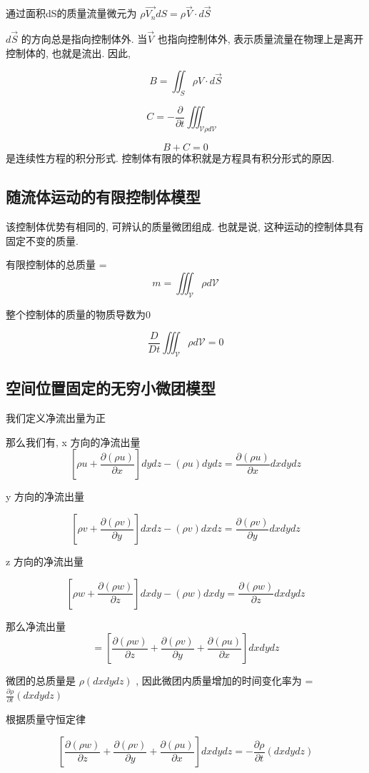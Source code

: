 通过面积dS的质量流量微元为 $\rho \vec{V_n} dS = \rho \vec{V} \cdot d\vec{S}$

$d \vec{S}$ 的方向总是指向控制体外. 当$\vec{V}$ 也指向控制体外, 表示质量流量在物理上是离开控制体的, 也就是流出. 因此,

$$
	B = \iint_{S} \rho V \cdot d\vec{S}
$$

$$
	C = - \frac{\partial}{\partial t}\iiint_{\mathcal{V} \rho d \mathcal{V}}
$$

$$
	B + C = 0
$$
是连续性方程的积分形式. 控制体有限的体积就是方程具有积分形式的原因.


\subsection{随流体运动的有限控制体模型}
该控制体优势有相同的, 可辨认的质量微团组成. 也就是说, 这种运动的控制体具有固定不变的质量.

有限控制体的总质量 =
$$
	m = \iiint_{\mathcal{V}} \rho d \mathcal{V}
$$

整个控制体的质量的物质导数为0

$$
	\frac{D}{Dt} \iiint_{\mathcal{V}} \rho d \mathcal{V} = 0
$$

\subsection{空间位置固定的无穷小微团模型}

我们定义净流出量为正

那么我们有, x 方向的净流出量
$$
	[ \rho u + \frac{\partial (\rho u)}{\partial x} ] dy dz - (\rho u) dydz = \frac{\partial (\rho u)}{\partial x} dxdydz
$$

y 方向的净流出量

$$
	[ \rho v + \frac{\partial (\rho v)}{\partial y} ] dx dz - (\rho v) dxdz = \frac{\partial (\rho v)}{\partial y} dxdydz
$$

z 方向的净流出量

$$
	[ \rho w + \frac{\partial (\rho w)}{\partial z} ] dx dy - (\rho w) dxdy = \frac{\partial (\rho w)}{\partial z} dxdydz
$$

那么净流出量 $$=[\frac{\partial (\rho w)}{\partial z} + \frac{\partial (\rho v)}{\partial y} + \frac{\partial (\rho u)}{\partial x} ] dxdydz$$

微团的总质量是 $\rho (dxdydz)$ , 因此微团内质量增加的时间变化率为 = $\frac{\partial \rho}{\partial t} (dxdydz)$


根据质量守恒定律

$$
	[\frac{\partial (\rho w)}{\partial z} + \frac{\partial (\rho v)}{\partial y} + \frac{\partial (\rho u)}{\partial x} ] dxdydz = -\frac{\partial \rho}{\partial t} (dxdydz)
$$

